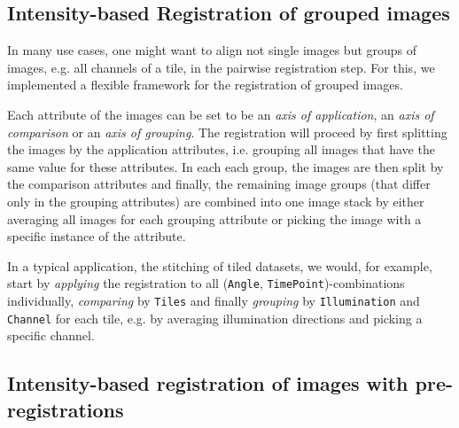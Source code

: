 \subsection*{Intensity-based Registration of grouped images}

In many use cases, one might want to align not single images but groups of images, e.g. all channels of a tile, in the pairwise registration step. For this, we implemented a flexible framework for the registration of grouped images.

Each attribute of the images can be set to be an \emph{axis of application}, an \emph{axis of comparison} or an \emph{axis of grouping}. The registration will proceed by first splitting the images by the application attributes, i.e. grouping all images that have the same value for these attributes. In each each group, the images are then split by the comparison attributes and finally, the remaining image groups (that differ only in the grouping attributes) are combined into one image stack by either averaging all images for each grouping attribute or picking the image with a specific instance of the attribute.   

In a typical application, the stitching of tiled datasets, we would, for example, start by \emph{applying} the registration to all (\texttt{Angle}, \texttt{TimePoint})-combinations individually, \emph{comparing} by \texttt{Tiles} and finally \emph{grouping} by \texttt{Illumination} and \texttt{Channel} for each tile, e.g. by averaging illumination directions and picking a specific channel.

\subsection*{Intensity-based registration of images with pre-registrations}

